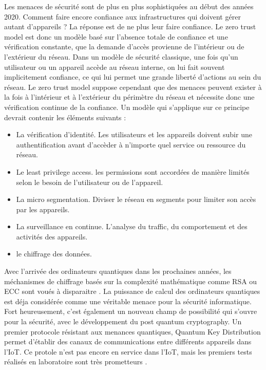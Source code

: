 Les menaces de sécurité sont de plus en plus sophistiquées au début des années 2020. Comment faire encore confiance aux infrastructures qui doivent gérer autant d'appareils ? La réponse est de ne plus leur faire confiance. Le zero trust model est donc un modèle basé sur l'absence totale de confiance et une vérification constante, que la demande d'accès provienne de l'intérieur ou de l'extérieur du réseau. Dans un modèle de sécurité classique, une fois qu'un utilisateur ou un appareil accède au réseau interne, on lui fait souvent implicitement confiance, ce qui lui permet une grande liberté d'actions au sein du réseau. Le zero trust model suppose cependant que des menaces peuvent exister à la fois à l’intérieur et à l’extérieur du périmètre du réseau et nécessite donc une vérification continue de la confiance. Un modèle qui s'applique sur ce principe devrait contenir les éléments suivants \cite{zero1} :
\begin{itemize}
\item La vérification d'identité. Les utilisateurs et les appareils doivent subir une authentification avant d'accèder à n'importe quel service ou ressource du réseau.
\item Le least privilege access. les permissions sont accordées de manière limités selon le besoin de l'utilisateur ou de l'appareil.
\item La micro segmentation. Diviser le réseau en segments pour limiter son accès par les appareils.
\item La surveillance en continue. L'analyse du traffic, du comportement et des activités des appareils.
\item le chiffrage des données.
\end{itemize}

\vspace{0.1cm}


Avec l'arrivée des ordinateurs quantiques dans les prochaines années, les méchanismes de chiffrage basés sur la complexité mathématique comme \ac{RSA} ou \ac{ECC} sont voués à disparaitre  \cite{quantumcrypto}. La puissance de calcul des ordinateurs quantiques est déja considérée comme une véritable menace pour la sécurité informatique. Fort heureusement, c'est également un nouveau champ de possibilité qui s'ouvre pour la sécurité, avec le développement du post quantum cryptography. Un premier protocole résistant aux menances quantiques, Quantum Key Distribution permet d'établir des canaux de communications entre différents appareils dans l'\ac{IoT}. Ce protole n'est pas encore en service dans l'\ac{IoT}, mais les premiers tests réalisés en laboratoire sont très prometteurs \cite{qinternet}.